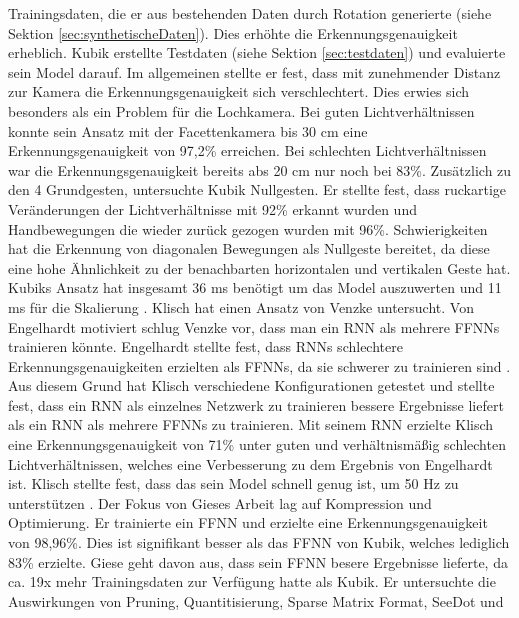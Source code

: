 Trainingsdaten, die er aus bestehenden Daten durch Rotation generierte (siehe Sektion \ref{sec:synthetischeDaten}). Dies erhöhte die Erkennungsgenauigkeit erheblich. Kubik erstellte Testdaten (siehe
Sektion \ref{sec:testdaten}) und evaluierte sein Model darauf. Im allgemeinen stellte er fest, dass mit zunehmender Distanz zur Kamera die Erkennungsgenauigkeit sich verschlechtert. Dies erwies sich besonders als ein
Problem für die Lochkamera. Bei guten Lichtverhältnissen konnte sein Ansatz mit der Facettenkamera bis 30 cm eine Erkennungsgenauigkeit von 97,2\% erreichen. Bei schlechten Lichtverhältnissen war die Erkennungsgenauigkeit
bereits abs 20 cm nur noch bei 83\%. Zusätzlich zu den 4 Grundgesten, untersuchte Kubik Nullgesten. Er stellte fest, dass ruckartige Veränderungen der Lichtverhältnisse mit 92\% erkannt wurden und Handbewegungen die wieder
zurück gezogen wurden mit 96\%. Schwierigkeiten hat die Erkennung von diagonalen Bewegungen als Nullgeste bereitet, da diese eine hohe Ähnlichkeit zu der benachbarten horizontalen und vertikalen Geste hat. Kubiks Ansatz
hat insgesamt 36 ms benötigt um das Model auszuwerten und 11 ms für die Skalierung \cite{kubikThesis}.
\newline
\newline
Klisch hat einen Ansatz von Venzke untersucht. Von Engelhardt motiviert schlug Venzke vor, dass man ein RNN als mehrere FFNNs trainieren könnte. Engelhardt stellte fest, dass RNNs schlechtere
Erkennungsgenauigkeiten erzielten als FFNNs, da sie schwerer zu trainieren sind \cite{engelhardtThesis}. Aus diesem Grund hat Klisch verschiedene Konfigurationen getestet und stellte fest,
dass ein RNN als einzelnes Netzwerk zu trainieren bessere Ergebnisse liefert als ein RNN als mehrere FFNNs zu trainieren. Mit seinem RNN erzielte Klisch eine Erkennungsgenauigkeit von 71\% unter guten und verhältnismäßig
schlechten Lichtverhältnissen, welches eine Verbesserung zu dem Ergebnis von Engelhardt ist. Klisch stellte fest, dass das sein Model schnell genug ist, um 50 Hz zu unterstützen \cite{klischThesis}.
\newline
\newline
Der Fokus von Gieses Arbeit lag auf Kompression und Optimierung. Er trainierte ein FFNN und erzielte eine Erkennungsgenauigkeit von 98,96\%. Dies ist signifikant besser als das FFNN von Kubik, welches lediglich 83\% erzielte.
Giese geht davon aus, dass sein FFNN besere Ergebnisse lieferte, da ca. 19x mehr Trainingsdaten zur Verfügung hatte als Kubik. Er untersuchte die Auswirkungen von Pruning, Quantitisierung, Sparse Matrix Format, SeeDot und
